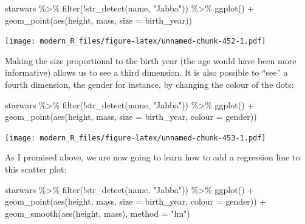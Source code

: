 \documentclass[
]{article}
\newenvironment{Shaded}{\begin{snugshade}}{\end{snugshade}}
\newcommand{\AttributeTok}[1]{\textcolor[rgb]{0.77,0.63,0.00}{#1}}
\newcommand{\FunctionTok}[1]{\textcolor[rgb]{0.00,0.00,0.00}{#1}}
\newcommand{\NormalTok}[1]{#1}
\newcommand{\SpecialCharTok}[1]{\textcolor[rgb]{0.00,0.00,0.00}{#1}}
\newcommand{\StringTok}[1]{\textcolor[rgb]{0.31,0.60,0.02}{#1}}
\begin{document}
\begin{Shaded}
\begin{Highlighting}[]
\NormalTok{starwars }\SpecialCharTok{\%\textgreater{}\%}
  \FunctionTok{filter}\NormalTok{(}\SpecialCharTok{!}\FunctionTok{str\_detect}\NormalTok{(name, }\StringTok{"Jabba"}\NormalTok{)) }\SpecialCharTok{\%\textgreater{}\%}
  \FunctionTok{ggplot}\NormalTok{() }\SpecialCharTok{+}
    \FunctionTok{geom\_point}\NormalTok{(}\FunctionTok{aes}\NormalTok{(height, mass, }\AttributeTok{size =}\NormalTok{ birth\_year))}
\end{Highlighting}
\end{Shaded}

\texttt{[image: modern\_R\_files/figure-latex/unnamed-chunk-452-1.pdf]}

Making the size proportional to the birth year (the age would have been more informative) allows
us to see a third dimension. It is also possible to ``see'' a fourth dimension, the gender for instance,
by changing the colour of the dots:

\begin{Shaded}
\begin{Highlighting}[]
\NormalTok{starwars }\SpecialCharTok{\%\textgreater{}\%}
  \FunctionTok{filter}\NormalTok{(}\SpecialCharTok{!}\FunctionTok{str\_detect}\NormalTok{(name, }\StringTok{"Jabba"}\NormalTok{)) }\SpecialCharTok{\%\textgreater{}\%}
  \FunctionTok{ggplot}\NormalTok{() }\SpecialCharTok{+}
    \FunctionTok{geom\_point}\NormalTok{(}\FunctionTok{aes}\NormalTok{(height, mass, }\AttributeTok{size =}\NormalTok{ birth\_year, }\AttributeTok{colour =}\NormalTok{ gender))}
\end{Highlighting}
\end{Shaded}

\texttt{[image: modern\_R\_files/figure-latex/unnamed-chunk-453-1.pdf]}

As I promised above, we are now going to learn how to add a regression line to this scatter plot:

\begin{Shaded}
\begin{Highlighting}[]
\NormalTok{starwars }\SpecialCharTok{\%\textgreater{}\%}
  \FunctionTok{filter}\NormalTok{(}\SpecialCharTok{!}\FunctionTok{str\_detect}\NormalTok{(name, }\StringTok{"Jabba"}\NormalTok{)) }\SpecialCharTok{\%\textgreater{}\%}
  \FunctionTok{ggplot}\NormalTok{() }\SpecialCharTok{+}
    \FunctionTok{geom\_point}\NormalTok{(}\FunctionTok{aes}\NormalTok{(height, mass, }\AttributeTok{size =}\NormalTok{ birth\_year, }\AttributeTok{colour =}\NormalTok{ gender)) }\SpecialCharTok{+}
    \FunctionTok{geom\_smooth}\NormalTok{(}\FunctionTok{aes}\NormalTok{(height, mass), }\AttributeTok{method  =} \StringTok{"lm"}\NormalTok{)}
\end{Highlighting}
\end{Shaded}
\end{document}
